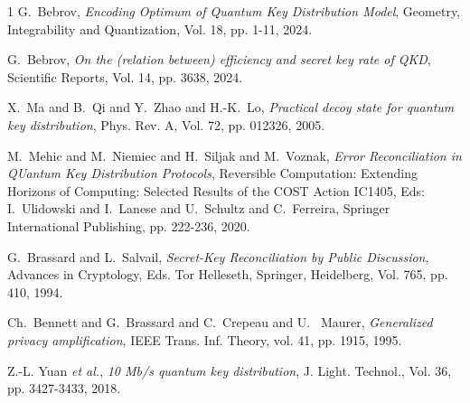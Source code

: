\documentclass[journal,onecolumn]{IEEEtran}
\theoremstyle{thmstyleone}%
\theoremstyle{thmstyletwo}%
\theoremstyle{thmstylethree}%
\begin{document}
\begin{thebibliography}{1}
		G.~Bebrov, \emph{Encoding Optimum of Quantum Key Distribution Model}, Geometry, Integrability and Quantization, Vol. 18, pp. 1-11, 2024.
		
		G.~Bebrov, \emph{On the (relation between) efficiency and secret key rate of QKD}, Scientific Reports, Vol. 14, pp. 3638, 2024.
		
		X.~Ma and B.~Qi and Y.~Zhao and H.-K.~Lo, \emph{Practical decoy state for quantum key distribution}, Phys. Rev. A, Vol. 72, pp. 012326, 2005.
		
		M.~Mehic and M.~Niemiec and H.~Siljak and M.~Voznak, \emph{Error Reconciliation in QUantum Key Distribution Protocols}, Reversible Computation: Extending Horizons of Computing: Selected Results of the COST Action IC1405, Eds: I.~Ulidowski and I.~Lanese and U.~Schultz and C.~Ferreira, Springer International Publishing, pp. 222-236, 2020.
		
%		
		
			G.~Brassard and  L.~Salvail,
			\emph{Secret-Key Reconciliation by Public Discussion}, Advances in Cryptology, Eds. Tor Helleseth, Springer, Heidelberg, Vol. 765, pp. 410, 1994. 
		
			Ch.~Bennett and G.~Brassard and C.~Crepeau and U.~ Maurer, \emph{Generalized privacy amplification}, IEEE Trans. Inf. Theory, vol. 41, pp. 1915, 1995.
		
			Z.-L. Yuan \emph{et al.}, \emph{10 Mb/s quantum key distribution}, J. Light. Technol., Vol. 36, pp. 3427-3433, 2018.
		
	
		
		
		
%		
%		
%		
%	
%		
		
		
	\end{thebibliography}
	
\end{document}
